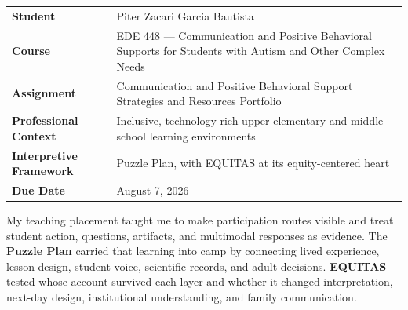 \documentclass[11pt]{article}
\begin{document}
\begin{titlepage}
\vfill

\begin{center}
\renewcommand{\arraystretch}{1.18}
\setlength{\tabcolsep}{4pt}
\begin{tabular}{>{\bfseries\raggedleft\arraybackslash}p{1.75in} >{\raggedright\arraybackslash}p{5.08in}}
Student & Piter Zacari Garcia Bautista \\
Course & EDE 448 --- Communication and Positive Behavioral Supports for Students with Autism and Other Complex Needs \\
Assignment & Communication and Positive Behavioral Support Strategies and Resources Portfolio \\
Professional Context & Inclusive, technology-rich upper-elementary and middle school learning environments \\
Interpretive Framework & Puzzle Plan, with EQUITAS at its equity-centered heart \\
Due Date & August 7, 2026 \\
\end{tabular}
\end{center}

\vfill

\begin{center}
\begin{minipage}{0.94\textwidth}
\small
My teaching placement taught me to make participation routes visible and treat student action, questions, artifacts, and multimodal responses as evidence. The \textbf{Puzzle Plan} carried that learning into camp by connecting lived experience, lesson design, student voice, scientific records, and adult decisions. \textbf{EQUITAS} tested whose account survived each layer and whether it changed interpretation, next-day design, institutional understanding, and family communication.
\end{minipage}

\vspace{0.12in}
\end{center}

\restoregeometry
\end{titlepage}
\hypersetup{pageanchor=true}
\end{document}

